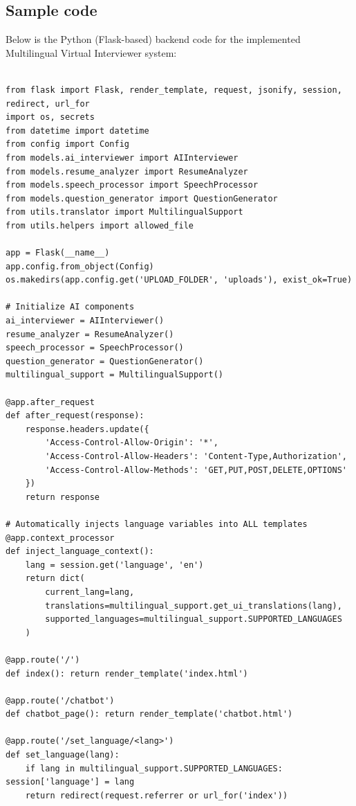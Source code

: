 \documentclass[12pt]{article}
\begin{document}
\subsection{Sample code}

\vspace{10pt}

Below is the Python (Flask-based) backend code for the implemented Multilingual Virtual Interviewer system:

\begin{lstlisting}[language=Arduino]

from flask import Flask, render_template, request, jsonify, session, redirect, url_for
import os, secrets
from datetime import datetime
from config import Config
from models.ai_interviewer import AIInterviewer
from models.resume_analyzer import ResumeAnalyzer
from models.speech_processor import SpeechProcessor
from models.question_generator import QuestionGenerator
from utils.translator import MultilingualSupport
from utils.helpers import allowed_file

app = Flask(__name__)
app.config.from_object(Config)
os.makedirs(app.config.get('UPLOAD_FOLDER', 'uploads'), exist_ok=True)

# Initialize AI components
ai_interviewer = AIInterviewer()
resume_analyzer = ResumeAnalyzer()
speech_processor = SpeechProcessor()
question_generator = QuestionGenerator()
multilingual_support = MultilingualSupport()

@app.after_request
def after_request(response):
    response.headers.update({
        'Access-Control-Allow-Origin': '*',
        'Access-Control-Allow-Headers': 'Content-Type,Authorization',
        'Access-Control-Allow-Methods': 'GET,PUT,POST,DELETE,OPTIONS'
    })
    return response

# Automatically injects language variables into ALL templates
@app.context_processor
def inject_language_context():
    lang = session.get('language', 'en')
    return dict(
        current_lang=lang,
        translations=multilingual_support.get_ui_translations(lang),
        supported_languages=multilingual_support.SUPPORTED_LANGUAGES
    )

@app.route('/')
def index(): return render_template('index.html')

@app.route('/chatbot')
def chatbot_page(): return render_template('chatbot.html')

@app.route('/set_language/<lang>')
def set_language(lang):
    if lang in multilingual_support.SUPPORTED_LANGUAGES: session['language'] = lang
    return redirect(request.referrer or url_for('index'))


\end{lstlisting}
\end{document}

